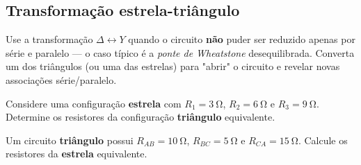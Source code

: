 


\subsection{Transformação estrela-triângulo}

\begin{conceito}
Use a transformação $\Delta\leftrightarrow Y$ quando o circuito \textbf{não}
puder ser reduzido apenas por série e paralelo --- o caso típico é a
\emph{ponte de Wheatstone} desequilibrada. Converta um dos triângulos (ou uma das
estrelas) para "abrir" o circuito e revelar novas associações série/paralelo.
\end{conceito}

\legendaniveis

\blocofixacao

\begin{questao}[1]{}
Considere uma configuração \textbf{estrela} com $R_1=\SI{3}{\ohm}$,
$R_2=\SI{6}{\ohm}$ e $R_3=\SI{9}{\ohm}$. Determine os resistores da configuração
\textbf{triângulo} equivalente.
\end{questao}

\begin{questao}[1]{}
Um circuito \textbf{triângulo} possui $R_{AB}=\SI{10}{\ohm}$,
$R_{BC}=\SI{5}{\ohm}$ e $R_{CA}=\SI{15}{\ohm}$. Calcule os resistores da
\textbf{estrela} equivalente.
\end{questao}

